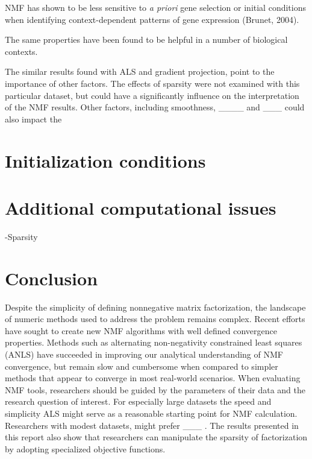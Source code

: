 \documentclass[final,leqno,onefignum,onetabnum]{siamltex1213}
\begin{document}
NMF has shown to be less sensitive to \textit{a priori} gene selection or initial conditions when identifying context-dependent patterns of gene expression (Brunet, 2004). 

The same properties have been found to be helpful in a number of biological contexts. 

The similar results found with ALS and gradient projection, point to the importance of other factors. The effects of sparsity were not examined with this particular dataset, but could have a significantly influence on the interpretation of the NMF results. Other factors, including smoothness, ____ and ___ could also impact the 

\section{Initialization conditions}

\section{Additional computational issues}
-Sparsity 

\section{Conclusion} Despite the simplicity of defining nonnegative matrix factorization, the landscape of numeric methods used to address the problem remains complex. Recent efforts have sought to create new NMF algorithms with well defined convergence properties. Methods such as alternating non-negativity constrained least squares (ANLS) have succeeded in improving our analytical understanding of NMF convergence, but remain slow and cumbersome when compared to simpler methods that appear to converge in most real-world scenarios. When evaluating NMF tools, researchers should be guided by the parameters of their data and the research question of interest. For especially large datasets the speed and simplicity ALS might serve as a reasonable starting point for NMF calculation. Researchers with modest datasets, might prefer ___ . The results presented in this report also show that researchers can manipulate the sparsity of factorization by adopting specialized objective functions. 
\end{document}
